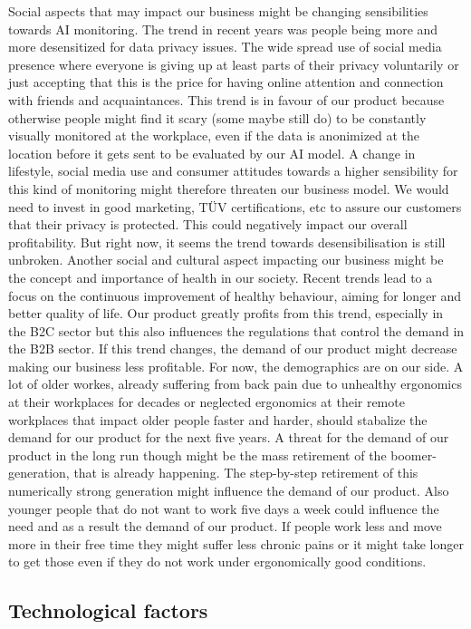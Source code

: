 Social aspects that may impact our business might be changing sensibilities towards AI monitoring. The trend in recent years was people being more and more desensitized for data privacy issues. The wide spread use of social media presence where everyone is giving up at least parts of their privacy voluntarily or just accepting that this is the price for having online attention and connection with friends and acquaintances. This trend is in favour of our product because otherwise people might find it scary (some maybe still do) to be constantly visually monitored at the workplace, even if the data is anonimized at the location before it gets sent to be evaluated by our AI model. A change in lifestyle, social media use and consumer attitudes towards a higher sensibility for this kind of monitoring might therefore threaten our business model. We would need to invest in good marketing, TÜV certifications, etc to assure our customers that their privacy is protected. This could negatively impact our overall profitability. But right now, it seems the trend towards desensibilisation is still unbroken. Another social and cultural aspect impacting our business might be the concept and importance of health in our society. Recent trends lead to a focus on the continuous improvement of healthy behaviour, aiming for longer and better quality of life. Our product greatly profits from this trend, especially in the B2C sector but this also influences the regulations that control the demand in the B2B sector. If this trend changes, the demand of our product might decrease making our business less profitable. For now, the demographics are on our side. A lot of older workes, already suffering from back pain due to unhealthy ergonomics at their workplaces for decades or neglected ergonomics at their remote workplaces that impact older people faster and harder, should stabalize the demand for our product for the next five years. A threat for the demand of our product in the long run though might be the mass retirement of the boomer-generation, that is already happening. The step-by-step retirement of this numerically strong generation might influence the demand of our product. Also younger people that do not want to work five days a week could influence the need and as a result the demand of our product. If people work less and move more in their free time they might suffer less chronic pains or it might take longer to get those even if they do not work under ergonomically good conditions.

\subsection{Technological factors}

